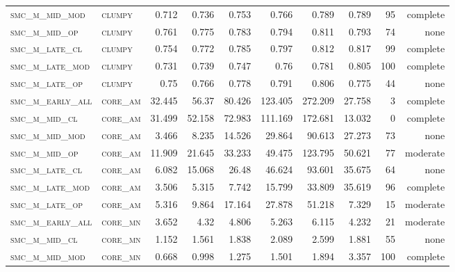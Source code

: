 \begin{landscape}
\begin{center}
\begin{footnotesize}
\begin{longtable}{llrrrrr|rrr}
\textsc{smc\_m\_mid\_mod  } & \textsc{clumpy    }   & 0.712    & 0.736    & 0.753    & 0.766    & 0.789    & 0.789    & 95  & complete \\
\textsc{smc\_m\_mid\_op   } & \textsc{clumpy    }   & 0.761    & 0.775    & 0.783    & 0.794    & 0.811    & 0.793    & 74  & none     \\
\textsc{smc\_m\_late\_cl  } & \textsc{clumpy    }   & 0.754    & 0.772    & 0.785    & 0.797    & 0.812    & 0.817    & 99  & complete \\
\textsc{smc\_m\_late\_mod } & \textsc{clumpy    }   & 0.731    & 0.739    & 0.747    & 0.76     & 0.781    & 0.805    & 100 & complete \\
\textsc{smc\_m\_late\_op  } & \textsc{clumpy    }   & 0.75     & 0.766    & 0.778    & 0.791    & 0.806    & 0.775    & 44  & none     \\
\textsc{smc\_m\_early\_all} & \textsc{core\_am  }   & 32.445   & 56.37    & 80.426   & 123.405  & 272.209  & 27.758   & 3   & complete \\
\textsc{smc\_m\_mid\_cl   } & \textsc{core\_am  }   & 31.499   & 52.158   & 72.983   & 111.169  & 172.681  & 13.032   & 0   & complete \\
\textsc{smc\_m\_mid\_mod  } & \textsc{core\_am  }   & 3.466    & 8.235    & 14.526   & 29.864   & 90.613   & 27.273   & 73  & none     \\
\textsc{smc\_m\_mid\_op   } & \textsc{core\_am  }   & 11.909   & 21.645   & 33.233   & 49.475   & 123.795  & 50.621   & 77  & moderate \\
\textsc{smc\_m\_late\_cl  } & \textsc{core\_am  }   & 6.082    & 15.068   & 26.48    & 46.624   & 93.601   & 35.675   & 64  & none     \\
\textsc{smc\_m\_late\_mod } & \textsc{core\_am  }   & 3.506    & 5.315    & 7.742    & 15.799   & 33.809   & 35.619   & 96  & complete \\
\textsc{smc\_m\_late\_op  } & \textsc{core\_am  }   & 5.316    & 9.864    & 17.164   & 27.878   & 51.218   & 7.329    & 15  & moderate \\
\textsc{smc\_m\_early\_all} & \textsc{core\_mn  }   & 3.652    & 4.32     & 4.806    & 5.263    & 6.115    & 4.232    & 21  & moderate \\
\textsc{smc\_m\_mid\_cl   } & \textsc{core\_mn  }   & 1.152    & 1.561    & 1.838    & 2.089    & 2.599    & 1.881    & 55  & none     \\
\textsc{smc\_m\_mid\_mod  } & \textsc{core\_mn  }   & 0.668    & 0.998    & 1.275    & 1.501    & 1.894    & 3.357    & 100 & complete \\

\end{longtable}
\end{footnotesize}
\end{center}
\end{landscape}
